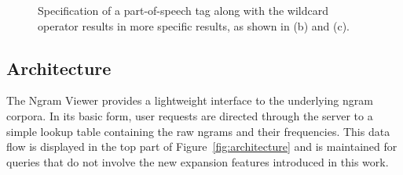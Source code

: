 \documentclass[11pt,a4paper]{article}
\begin{document}
\begin{figure}[!t]
\centering
\addtolength{\subfigcapskip}{-0.2cm}
\hspace*{-0.5cm}
\caption{\label{fig:presidents}
Specification of a part-of-speech tag along with the wildcard operator results in more
specific results, as shown in (b) and (c).}
\end{figure}

\subsection{Architecture}
The Ngram Viewer provides a lightweight interface to the underlying ngram corpora. In its basic form, user requests are directed through the server to a simple lookup table containing the raw ngrams and their frequencies. This data flow is displayed in the top part of Figure~\ref{fig:architecture} and is maintained for queries that do not involve the new expansion features introduced in this work.
\end{document}
